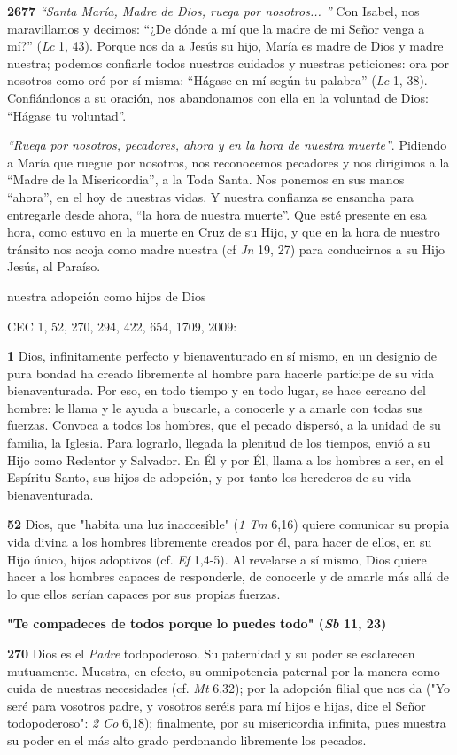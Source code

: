 \documentclass[]{article}
\begin{document}
\textbf{2677} \emph{``Santa María, Madre de Dios, ruega por nosotros...
''} Con Isabel, nos maravillamos y decimos: ``¿De dónde a mí que la
madre de mi Señor venga a mí?'' (\emph{Lc} 1, 43). Porque nos da a Jesús
su hijo, María es madre de Dios y madre nuestra; podemos confiarle todos
nuestros cuidados y nuestras peticiones: ora por nosotros como oró por
sí misma: ``Hágase en mí según tu palabra'' (\emph{Lc} 1, 38).
Confiándonos a su oración, nos abandonamos con ella en la voluntad de
Dios: ``Hágase tu voluntad''.

\emph{``Ruega por nosotros, pecadores, ahora y en la hora de nuestra
muerte''}. Pidiendo a María que ruegue por nosotros, nos reconocemos
pecadores y nos dirigimos a la ``Madre de la Misericordia'', a la Toda
Santa. Nos ponemos en sus manos ``ahora'', en el hoy de nuestras vidas.
Y nuestra confianza se ensancha para entregarle desde ahora, ``la hora
de nuestra muerte''. Que esté presente en esa hora, como estuvo en la
muerte en Cruz de su Hijo, y que en la hora de nuestro tránsito nos
acoja como madre nuestra (cf \emph{Jn} 19, 27) para conducirnos a su
Hijo Jesús, al Paraíso.

nuestra adopción como hijos de Dios

CEC 1, 52, 270, 294, 422, 654, 1709, 2009:

\textbf{1} Dios, infinitamente perfecto y bienaventurado en sí mismo, en
un designio de pura bondad ha creado libremente al hombre para hacerle
partícipe de su vida bienaventurada. Por eso, en todo tiempo y en todo
lugar, se hace cercano del hombre: le llama y le ayuda a buscarle, a
conocerle y a amarle con todas sus fuerzas. Convoca a todos los hombres,
que el pecado dispersó, a la unidad de su familia, la Iglesia. Para
lograrlo, llegada la plenitud de los tiempos, envió a su Hijo como
Redentor y Salvador. En Él y por Él, llama a los hombres a ser, en el
Espíritu Santo, sus hijos de adopción, y por tanto los herederos de su
vida bienaventurada.

\textbf{52} Dios, que "habita una luz inaccesible" (\emph{1 Tm} 6,16)
quiere comunicar su propia vida divina a los hombres libremente creados
por él, para hacer de ellos, en su Hijo único, hijos adoptivos (cf.
\emph{Ef} 1,4-5). Al revelarse a sí mismo, Dios quiere hacer a los
hombres capaces de responderle, de conocerle y de amarle más allá de lo
que ellos serían capaces por sus propias fuerzas.

\textbf{"Te compadeces de todos porque lo puedes todo" (\emph{Sb} 11,
23)}

\textbf{270} Dios es el \emph{Padre} todopoderoso. Su paternidad y su
poder se esclarecen mutuamente. Muestra, en efecto, su omnipotencia
paternal por la manera como cuida de nuestras necesidades (cf. \emph{Mt}
6,32); por la adopción filial que nos da ("Yo seré para vosotros padre,
y vosotros seréis para mí hijos e hijas, dice el Señor todopoderoso":
\emph{2 Co} 6,18); finalmente, por su misericordia infinita, pues
muestra su poder en el más alto grado perdonando libremente los pecados.
\end{document}
